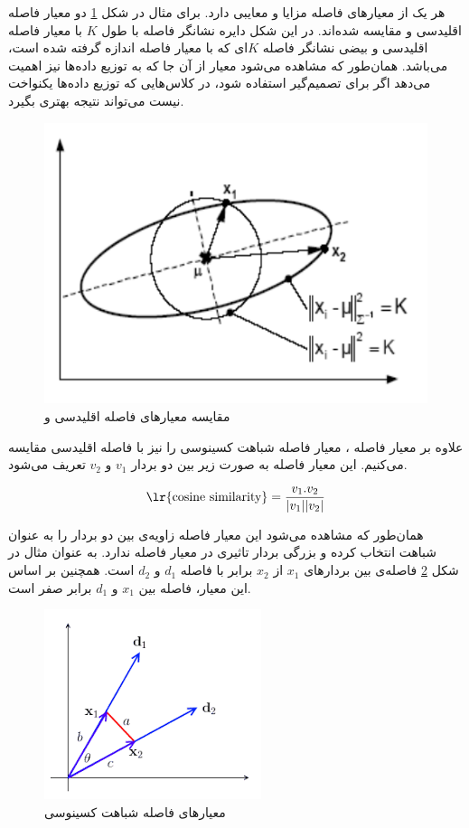 \documentclass{article}
\begin{document}
هر یک از معیار‌های فاصله مزایا و معایبی دارد. برای مثال در شکل \ref{euclidean-vs-mahalanobis} دو معیار فاصله
اقلیدسی و  مقایسه شده‌اند. در این شکل دایره نشانگر فاصله با طول $K$ با معیار فاصله اقلیدسی
و بیضی نشانگر فاصله $K$ای که با معیار فاصله  اندازه گرفته شده است، می‌باشد. همان‌طور که مشاهده
می‌شود معیار  از آن جا که به توزیع داده‌ها نیز اهمیت می‌دهد اگر برای تصمیم‌گیر 
استفاده شود، در کلاس‌هایی که توزیع داده‌ها یکنواخت نیست می‌تواند نتیجه بهتری بگیرد.

\begin{figure}[h]
    \centering
    \includegraphics[scale=0.3]{images/q7/euclidean_vs_manhataan.png}
    \caption{مقایسه معیار‌های فاصله اقلیدسی و }
    \label{euclidean-vs-mahalanobis}
\end{figure}

علاوه بر معیار فاصله ، معیار فاصله شباهت کسینوسی را نیز با فاصله اقلیدسی مقایسه می‌کنیم.
این معیار فاصله به صورت زیر بین دو بردار $v_1$ و $v_2$ تعریف می‌شود.

$$\text{\lr{cosine similarity}} = \frac{v_1.v_2}{|v_1||v_2|}$$

همان‌طور که مشاهده می‌شود این معیار فاصله زاویه‌ی بین دو بردار را به عنوان شباهت انتخاب کرده و بزرگی
بردار تاثیری در معیار فاصله ندارد. به عنوان مثال در شکل \ref{cosine-similarity}  فاصله‌ی بین بردار‌های
$x_1$ از $x_2$ برابر با فاصله $d_1$ و $d_2$ است. همچنین بر اساس این معیار، فاصله بین $x_1$ و $d_1$
برابر صفر است.

\begin{figure}[h]
    \centering
    \includegraphics[scale=0.3]{images/q7/cosine.png}
    \caption{معیار‌های فاصله شباهت کسینوسی}
    \label{cosine-similarity}
\end{figure}
\end{document}
